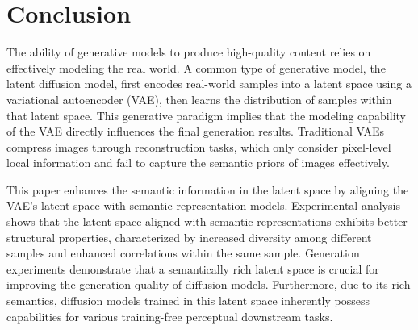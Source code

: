 \section{Conclusion}

The ability of generative models to produce high-quality content relies on effectively modeling the real world. A common type of generative model, the latent diffusion model, first encodes real-world samples into a latent space using a variational autoencoder (VAE), then learns the distribution of samples within that latent space. This generative paradigm implies that the modeling capability of the VAE directly influences the final generation results. Traditional VAEs compress images through reconstruction tasks, which only consider pixel-level local information and fail to capture the semantic priors of images effectively.

This paper enhances the semantic information in the latent space by aligning the VAE's latent space with semantic representation models. Experimental analysis shows that the latent space aligned with semantic representations exhibits better structural properties, characterized by increased diversity among different samples and enhanced correlations within the same sample. Generation experiments demonstrate that a semantically rich latent space is crucial for improving the generation quality of diffusion models. Furthermore, due to its rich semantics, diffusion models trained in this latent space inherently possess capabilities for various training-free perceptual downstream tasks.